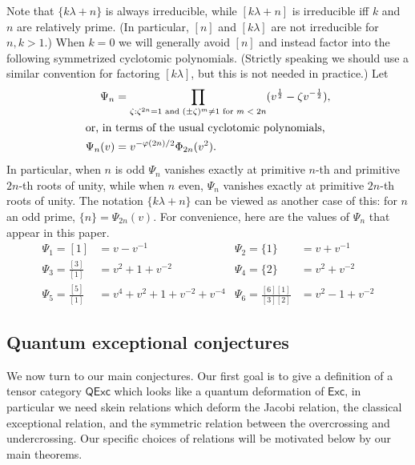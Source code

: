 \documentclass[12pt]{amsart}
\begin{document}
Note that $\{k\lambda + n\}$ is always irreducible, while $[k\lambda +
n]$ is irreducible iff $k$ and~$n$ are relatively prime. (In
particular, $[n]$ and $[k\lambda]$ are not irreducible for $n,k>1$.)
When
$k=0$ we will generally avoid $[n]$ and instead factor into the following
symmetrized cyclotomic polynomials.  (Strictly speaking we should use
a similar convention for factoring $[k \lambda]$, but this is not needed
in practice.)  Let
\begin{align*}
  \Psi_n &= \prod_{\zeta: \zeta^{2n} = 1 \text{ and } (\pm \zeta)^m \neq 1 \text{ for $m < 2n$}}
  (v^{\frac{1}{2}}-\zeta v^{-\frac{1}{2}}),\\
  \intertext{or, in terms of the usual cyclotomic polynomials,}
  \Psi_n(v) &= v^{-\varphi(2n)/2} \Phi_{2n}(v^2).
\end{align*}
In particular, when $n$ is odd $\Psi_n$ vanishes exactly at primitive
$n$-th and primitive $2n$-th roots of unity, while when $n$ even,
$\Psi_n$ vanishes exactly at primitive $2n$-th roots of unity.
The notation $\{k\lambda + n\}$ can be viewed as another case of this:
for $n$ an odd prime,
$\{n\} = \Psi_{2n}(v)$. For convenience, here are the values of $\Psi_n$ that
appear in this paper.
\begin{align*}
  \Psi_1 = [1] &= v - v^{-1} &
  \Psi_2 = \{1\} &= v + v^{-1}\\
  \Psi_3 = \frac{[3]}{[1]} &= v^2 + 1 + v^{-2}&
  \Psi_4 = \{2\} &= v^2 + v^{-2}\\
  \Psi_5 = \frac{[5]}{[1]} &= v^4 + v^2 + 1 + v^{-2} + v^{-4}&
  \Psi_6 = \frac{[6][1]}{[3][2]} &= v^2 - 1 + v^{-2}
\end{align*}


\subsection{Quantum exceptional conjectures}
\label{sec:intro-quantum}
We now turn to our main conjectures.  Our first goal is to give a definition
of a tensor category $\mathsf{QExc}$ which looks like a quantum deformation of
$\mathsf{Exc}$, in particular we need skein relations which deform the Jacobi
relation, the classical exceptional relation, and the symmetric relation
between the overcrossing and undercrossing.  Our specific choices of relations
will be motivated below by our main theorems.
\end{document}

